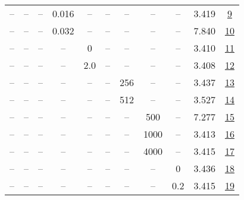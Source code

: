 \begin{table}[H]
\begin{tabular}{ccccccccccc}
-- & -- & -- & 0.016 & -- & -- & -- & -- & -- & 3.419 & \href{https://wandb.ai/stanford-mercury/optimizer-scaling/runs/sweep-130m-5B-adamw093957lr0.016-wd0.1-minlr0-warmup2000-b10.9-b-d1d1c5}{9} \\
-- & -- & -- & 0.032 & -- & -- & -- & -- & -- & 7.840 & \href{https://wandb.ai/stanford-mercury/optimizer-scaling/runs/sweep-130m-5B-adamw0d117blr0.032-wd0.1-minlr0-warmup2000-b10.9-b-180de6}{10} \\
-- & -- & -- & -- & 0 & -- & -- & -- & -- & 3.410 & \href{https://wandb.ai/stanford-mercury/optimizer-scaling/runs/sweep-130m-5B-adamw535ddelr0.008-wd0.1-minlr0-warmup2000-b10.9-b-6c9703}{11} \\
-- & -- & -- & -- & 2.0 & -- & -- & -- & -- & 3.408 & \href{https://wandb.ai/stanford-mercury/optimizer-scaling/runs/sweep-130m-5B-adamw80c699lr0.008-wd0.1-minlr0-warmup2000-b10.9-b-6682a7}{12} \\
-- & -- & -- & -- & -- & -- & 256 & -- & -- & 3.437 & \href{https://wandb.ai/stanford-mercury/optimizer-scaling/runs/sweep-130m-5B-adamw5098e9lr0.008-wd0.1-minlr0-warmup2000-b10.9-b-b203b1}{13} \\
-- & -- & -- & -- & -- & -- & 512 & -- & -- & 3.527 & \href{https://wandb.ai/stanford-mercury/optimizer-scaling/runs/sweep-130m-5B-adamw7fa927lr0.008-wd0.1-minlr0-warmup2000-b10.9-b-23a9e4}{14} \\
-- & -- & -- & -- & -- & -- & -- & 500 & -- & 7.277 & \href{https://wandb.ai/stanford-mercury/optimizer-scaling/runs/sweep-130m-5B-adamwb0eee1lr0.008-wd0.1-minlr0-warmup500-b10.9-b2-f92a87}{15} \\
-- & -- & -- & -- & -- & -- & -- & 1000 & -- & 3.413 & \href{https://wandb.ai/stanford-mercury/optimizer-scaling/runs/sweep-130m-5B-adamwdb2f8blr0.008-wd0.1-minlr0-warmup1000-b10.9-b-a48171}{16} \\
-- & -- & -- & -- & -- & -- & -- & 4000 & -- & 3.415 & \href{https://wandb.ai/stanford-mercury/optimizer-scaling/runs/sweep-130m-5B-adamw0cd0aalr0.008-wd0.1-minlr0-warmup4000-b10.9-b-26dd75}{17} \\
-- & -- & -- & -- & -- & -- & -- & -- & 0 & 3.436 & \href{https://wandb.ai/stanford-mercury/optimizer-scaling/runs/sweep-130m-5B-adamw7a3359lr0.008-wd0-minlr0-warmup2000-b10.9-b20-bf7e74}{18} \\
-- & -- & -- & -- & -- & -- & -- & -- & 0.2 & 3.415 & \href{https://wandb.ai/stanford-mercury/optimizer-scaling/runs/sweep-130m-5B-adamw1d5bddlr0.008-wd0.2-minlr0-warmup2000-b10.9-b-a991d6}{19} \\
\bottomrule
\end{tabular}
\end{table}

